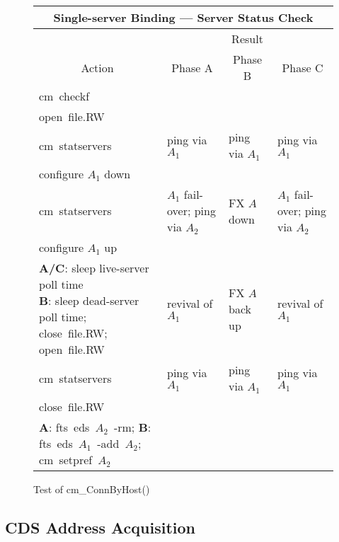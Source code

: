 \begin{figure}
\begin{tabular}{|p{1.4in}|p{0.9in}|p{0.9in}|p{0.9in}|}
\hline
\multicolumn{4}{|c|}{Single-server Binding --- Server Status Check} \\
\hline
\hline
 & \multicolumn{3}{c|}{Result} \\ \cline{2-4}
\multicolumn{1}{|c|}{Action} & \multicolumn{1}{c|}{Phase A} &
    \multicolumn{1}{c|}{Phase B} & \multicolumn{1}{c|}{Phase C} \\
%
\hline
{\raggedright cm~checkf} & & & \\
%
\hline
{\raggedright open~file.RW} & & & \\
%
\hline
{\raggedright cm~statservers} &
{\raggedright ping via $A_{1}$} &
{\raggedright ping via $A_{1}$} &
{\raggedright ping via $A_{1}$} \\
%
\hline
{\raggedright configure $A_{1}$ down} & & & \\
%
\hline
{\raggedright cm~statservers} &
{\raggedright $A_{1}$ fail-over;\\ping via $A_{2}$} &
{\raggedright FX $A$ down} &
{\raggedright $A_{1}$ fail-over;\\ping via $A_{2}$} \\
%
\hline
{\raggedright configure $A_{1}$ up} & & & \\
%
\hline
{\raggedright
  {\bf A/C}: sleep live-server poll time\\
  {\bf B}: sleep dead-server poll time;\\close~file.RW;\\open~file.RW} &
{\raggedright revival of $A_{1}$} &
{\raggedright FX $A$ back up} &
{\raggedright revival of $A_{1}$} \\
%
\hline
{\raggedright cm~statservers} &
{\raggedright ping via $A_{1}$} &
{\raggedright ping via $A_{1}$} &
{\raggedright ping via $A_{1}$} \\
%
\hline
{\raggedright close~file.RW} & & & \\
%
\hline
{\raggedright
  {\bf A}: fts~eds~$A_{2}$~-rm;\\
  {\bf B}: fts~eds~$A_{1}$~-add~$A_{2}$;\\cm~setpref~$A_{2}$} & & & \\
%
\hline
\end{tabular}
\caption{Test of cm\_ConnByHost()}
\label{fig:connbyhost}
\end{figure}



\subsection{CDS Address Acquisition}
\label{subsec:flserver-addr}

